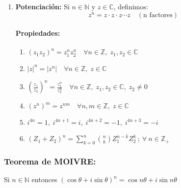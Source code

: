 \documentclass[a4paper,12pt]{article}
\begin{document}
\begin{enumerate}
\paragraph{Notación Exponencial:} Definimos $\text{cis} \theta = \cos \theta + i \sin \theta$ y
\[
\text{cis} \theta = e^{i\theta}, \quad e^{i\theta} = \cos \theta + i \sin \theta \quad \text{(fórmula de Euler)}
\]
Observación: 
\[
e^{i\theta + 2k\pi} = e^{i\theta}, \quad \forall k \in \mathbb{Z}
\]

\item \textbf{Potenciación:} 
Si $n \in \mathbb{N}$ y $z \in \mathbb{C}$, definimos:
\[
z^n = z \cdot z \cdot z \cdots z \quad (\text{n factores})
\]

\paragraph{Propiedades:}
\begin{enumerate}
    \item $ (z_1 z_2)^n = z_1^n z_2^n \quad \forall n \in \mathbb{Z}, \; z_1, z_2 \in \mathbb{C}$
    \item $ |z|^n = |z^n| \quad \forall n \in \mathbb{Z}, \; z \in \mathbb{C}$
    \item $ \left( \frac{z_1}{z_2} \right)^n = \frac{z_1^n}{z_2^n} \quad \forall n \in \mathbb{Z}, \; z_1, z_2 \in \mathbb{C}, \; z_2 \neq 0$
    \item $ (z^n)^m = z^{nm} \quad \forall n, m \in \mathbb{Z}, \; z \in \mathbb{C}$
    \item $ i^{4n} = 1, \; i^{4n+1} = i, \; i^{4n+2} = -1, \; i^{4n+3} = -i$
    \item $ (Z_1 + Z_2)^n = \sum_{k=0}^{n} \binom{n}{k} Z_1^{n-k} Z_2^k\ ;\ \forall\ n \in \mathbb{Z}_+$

\end{enumerate}

\end{enumerate}

\subsubsection{Teorema de MOIVRE:}
Si $n \in \mathbb{N}$ entonces $(\cos \theta + i \sin \theta)^n = \cos n\theta + i \sin n\theta$
\end{document}
